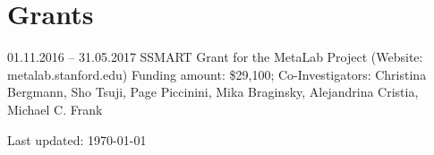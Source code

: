 \documentclass[letterpaper]{article}
\def\footerlink{}
\renewenvironment{itemize}{
  \begin{list}{}{
    \setlength{\leftmargin}{1.5em}
  }
}{
  \end{list}
}
\begin{document}
\section*{Grants}
\begin{itemize}
\item 01.11.2016 -- 31.05.2017 SSMART Grant for the MetaLab Project (Website: metalab.stanford.edu) Funding amount: \$29,100; Co-Investigators: Christina Bergmann, Sho
Tsuji, Page Piccinini, Mika Braginsky, Alejandrina Cristia, Michael C. Frank
\end{itemize}



\bigskip

\begin{center}
  \begin{footnotesize}
    Last updated: \today \\
    \href{\footerlink}{\texttt{\footerlink}}
  \end{footnotesize}
\end{center}
\end{document}
